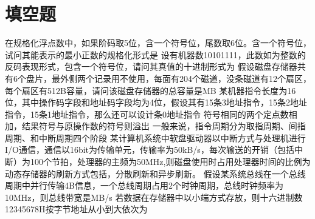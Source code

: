 \documentclass[a4paper]{exam}
\newif\ifprint
\newcommand{\blank}[2][1cm]{\uline{\makebox[#1][c]{%
			\ifprint
			\phantom{#2}%
			\else
			#2%
			\fi}}}
\begin{document}
\section{填空题}
\begin{questions}
	\question 在规格化浮点数中，如果阶码取5位，含一个符号位，尾数取6位。含一个符号位，试问其能表示的最小正数的规格化形式是\blank{}
	\question 设有机器数10101111，此数如为整数的反码表现形式，包含一个符号位，请问其真值的十进制形式为\blank{}
	\question 假设磁盘存储器共有6个盘片，最外侧两个记录用不使用，每面有204个磁道，没条磁道有12个扇区，每个扇区有512B容量，请问该磁盘存储器的总容量是\blank{}MB
	\question 某机器指令长度为16位，其中操作码字段和地址码字段均为4位，假设其有15条3地址指令，15条2地址指令，15条1地址指令，那么还可以设计\blank{}条0地址指令
	\question 符号相同的两个定点数相加，结果符号与原操作数的符号\blank{}则溢出
	\question 一般来说，指令周期分为取指周期、间指周期、\blank{}和中断周期四个阶段
	\question 某计算机系统中软盘驱动器以中断方式与处理机进行I/O通信，通信以16bit为传输单元，传输率为50kB/s，每次输送的开销（包括中断）为100个节拍，处理器的主频为50MHz,则磁盘使用时占用处理器时间的比例为\blank{}
	\question 动态存储器的刷新方式包括\blank{}，分散刷新和异步刷新。
	\question 假设某系统总线在一个总线周期中并行传输4B信息，一个总线周期占用2个时钟周期，总线时钟频率为10MHz，则总线带宽是\blank{}MB/s
	\question 若数据在存储器中以小端方式存放，则十六进制数12345678H按字节地址从小到大依次为\blank{}
\end{questions}
\end{document}
